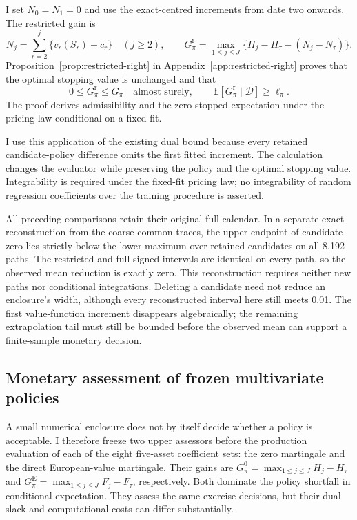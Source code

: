 \documentclass[11pt]{article}
\newcommand{\E}{\mathbb E}
\begin{document}
I set $N_0=N_1=0$ and use the exact-centred increments from date two onwards. The restricted gain is
\begin{equation}
 N_j=\sum_{r=2}^{j}\{v_r(S_r)-c_r\}\quad(j\geq2),\qquad
 G^{\mathrm r}_\pi=\max_{1\leq j\leq J}
 \{H_j-H_\tau-(N_j-N_\tau)\}.
\label{eq:restricted-gain}
\end{equation}
Proposition~\ref{prop:restricted-right} in Appendix~\ref{app:restricted-right} proves that the optimal stopping value is unchanged and that
\begin{equation}
 0\leq G^{\mathrm r}_\pi\leq G_\pi\quad\text{almost surely},\qquad
 \E[G^{\mathrm r}_\pi\mid\mathcal D]\geq\ell_\pi.
\label{eq:restricted-bound}
\end{equation}
The proof derives admissibility and the zero stopped expectation under the pricing law conditional on a fixed fit.

I use this application of the existing dual bound because every retained candidate-policy difference omits the first fitted increment. The calculation changes the evaluator while preserving the policy and the optimal stopping value. Integrability is required under the fixed-fit pricing law; no integrability of random regression coefficients over the training procedure is asserted.

All preceding comparisons retain their original full calendar. In a separate exact reconstruction from the coarse-common traces, the upper endpoint of candidate zero lies strictly below the lower maximum over retained candidates on all 8,192 paths. The restricted and full signed intervals are identical on every path, so the observed mean reduction is exactly zero. This reconstruction requires neither new paths nor conditional integrations. Deleting a candidate need not reduce an enclosure's width, although every reconstructed interval here still meets 0.01. The first value-function increment disappears algebraically; the remaining extrapolation tail must still be bounded before the observed mean can support a finite-sample monetary decision.

\subsection{Monetary assessment of frozen multivariate policies}
\label{sec:multivariate-monetary}

A small numerical enclosure does not by itself decide whether a policy is acceptable. I therefore freeze two upper assessors before the production evaluation of each of the eight five-asset coefficient sets: the zero martingale and the direct European-value martingale. Their gains are $G^0_\pi=\max_{1\leq j\leq J}H_j-H_\tau$ and $G^{\mathrm E}_\pi=\max_{1\leq j\leq J}F_j-F_\tau$, respectively. Both dominate the policy shortfall in conditional expectation. They assess the same exercise decisions, but their dual slack and computational costs can differ substantially.
\end{document}
